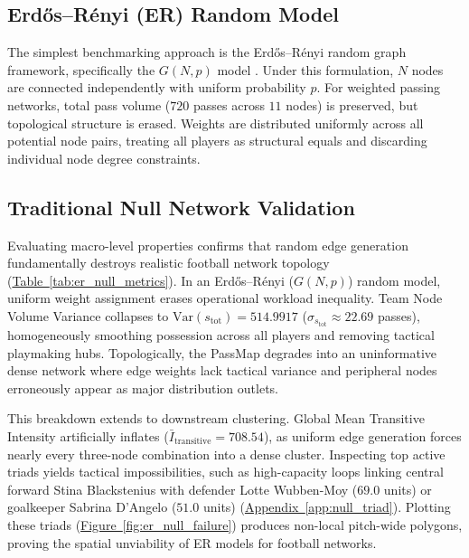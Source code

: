 \documentclass[12pt, a4paper]{article}
\begin{document}
\subsection{Erd{\H{o}}s--R{\'e}nyi (ER) Random Model}
\label{subsec:er_model}

The simplest benchmarking approach is the Erd{\H{o}}s--R{\'e}nyi random graph framework, specifically the $G(N, p)$ model \cite{gilbert1959, erdos1959}. Under this formulation, $N$ nodes are connected independently with uniform probability $p$. For weighted passing networks, total pass volume ($720$ passes across $11$ nodes) is preserved, but topological structure is erased. Weights are distributed uniformly across all potential node pairs, treating all players as structural equals and discarding individual node degree constraints.

\subsection{Traditional Null Network Validation}
\label{subsec:null_validation}

Evaluating macro-level properties confirms that random edge generation fundamentally destroys realistic football network topology (\hyperref[tab:er_null_metrics]{Table~\ref{tab:er_null_metrics}}). In an Erd{\H{o}}s--R{\'e}nyi ($G(N, p)$) random model, uniform weight assignment erases operational workload inequality. Team Node Volume Variance collapses to $\text{Var}(s_{\text{tot}}) = 514.9917$ ($\sigma_{s_{\text{tot}}} \approx 22.69$ passes), homogeneously smoothing possession across all players and removing tactical playmaking hubs. Topologically, the PassMap degrades into an uninformative dense network where edge weights lack tactical variance and peripheral nodes erroneously appear as major distribution outlets.

This breakdown extends to downstream clustering. Global Mean Transitive Intensity artificially inflates ($\bar{I}_{\text{transitive}} = 708.54$), as uniform edge generation forces nearly every three-node combination into a dense cluster. Inspecting top active triads yields tactical impossibilities, such as high-capacity loops linking central forward Stina Blackstenius with defender Lotte Wubben-Moy ($69.0$ units) or goalkeeper Sabrina D’Angelo ($51.0$ units) (\hyperref[app:null_triad]{Appendix~\ref{app:null_triad}}). Plotting these triads (\hyperref[fig:er_null_failure]{Figure~\ref{fig:er_null_failure}}) produces non-local pitch-wide polygons, proving the spatial unviability of ER models for football networks.
\end{document}
